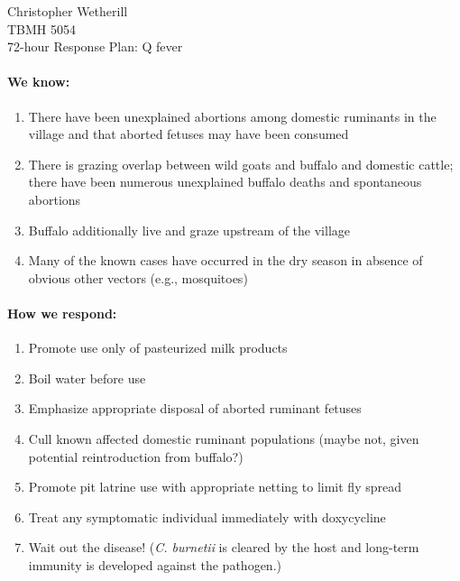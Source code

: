 \documentclass[11pt,letterpaper,final] {article}
\begin{document}

	\noindent Christopher Wetherill \\
	TBMH 5054 \\
	72-hour Response Plan: Q fever
	
	\paragraph{We know:}
	\begin{enumerate}
		\item There have been unexplained abortions among domestic ruminants in the village and that aborted fetuses may have been consumed
		\item There is grazing overlap between wild goats and buffalo and domestic cattle; there have been numerous unexplained buffalo deaths and spontaneous abortions
		\item Buffalo additionally live and graze upstream of the village
		\item Many of the known cases have occurred in the dry season in absence of obvious other vectors (e.g., mosquitoes)
	\end{enumerate}
	
	\paragraph{How we respond:}
	\begin{enumerate}
		\item Promote use only of pasteurized milk products
		\item Boil water before use
		\item Emphasize appropriate disposal of aborted ruminant fetuses 
		\item Cull known affected domestic ruminant populations (maybe not, given potential reintroduction from buffalo?)
		\item Promote pit latrine use with appropriate netting to limit fly spread
		\item Treat any symptomatic individual immediately with doxycycline
		\item Wait out the disease! (\textit{C. burnetii} is cleared by the host and long-term immunity is developed against the pathogen.)
	\end{enumerate}



% 
% 
\end{document}
